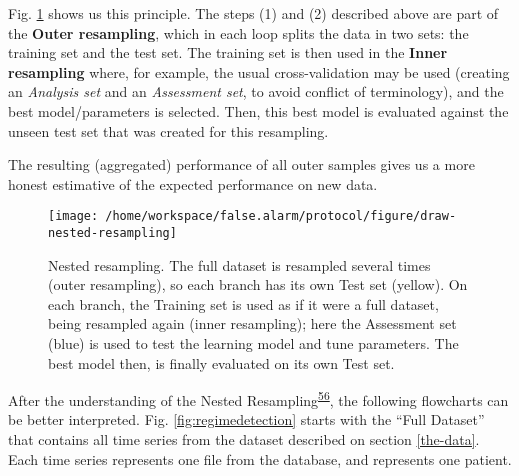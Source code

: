 \documentclass[12pt,twoside]{fmupthesis}
\begin{document}
Fig. \ref{fig:nestedresampling} shows us this principle. The steps (1) and (2) described above are
part of the \textbf{Outer resampling}, which in each loop splits the data in two sets: the training set
and the test set. The training set is then used in the \textbf{Inner resampling} where, for example, the
usual cross-validation may be used (creating an \emph{Analysis set} and an \emph{Assessment set}, to avoid
conflict of terminology), and the best model/parameters is selected. Then, this best model is
evaluated against the unseen test set that was created for this resampling.

The resulting (aggregated) performance of all outer samples gives us a more honest estimative
of the expected performance on new data.
\begin{figure}

{\centering \texttt{[image: /home/workspace/false.alarm/protocol/figure/draw-nested-resampling]} 

}

\caption{Nested resampling. The full dataset is resampled several times (outer resampling), so each branch has its own Test set (yellow). On each branch, the Training set is used as if it were a full dataset, being resampled again (inner resampling); here the Assessment set (blue) is used to test the learning model and tune parameters. The best model then, is finally evaluated on its own Test set.}\label{fig:nestedresampling}
\end{figure}
\hfill\break

After the understanding of the Nested Resampling\textsuperscript{\protect\hyperlink{ref-Bischl2012}{56}}, the following flowcharts can be
better interpreted. Fig. \ref{fig:regimedetection} starts with the ``Full Dataset'' that contains all
time series from the dataset described on section \ref{the-data}. Each time series represents one
file from the database, and represents one patient.
\end{document}

